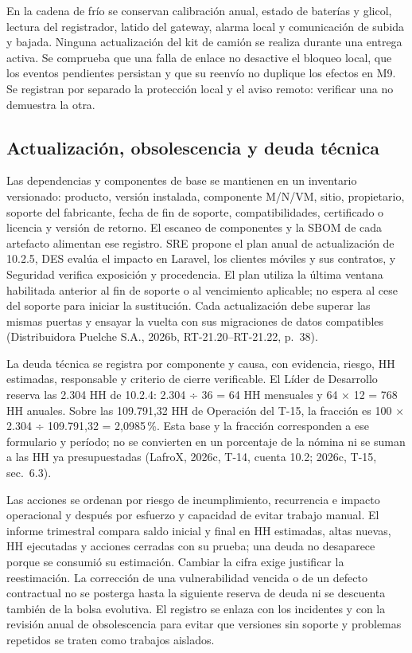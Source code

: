 En la cadena de frío se conservan calibración anual, estado de baterías y glicol, lectura del registrador, latido del gateway, alarma local y comunicación de subida y bajada. Ninguna actualización del kit de camión se realiza durante una entrega activa. Se comprueba que una falla de enlace no desactive el bloqueo local, que los eventos pendientes persistan y que su reenvío no duplique los efectos en M9. Se registran por separado la protección local y el aviso remoto: verificar una no demuestra la otra.

\subsection{Actualización, obsolescencia y deuda técnica}
\label{subsec:sd11-vigencia}

Las dependencias y componentes de base se mantienen en un inventario versionado: producto, versión instalada, componente M/N/VM, sitio, propietario, soporte del fabricante, fecha de fin de soporte, compatibilidades, certificado o licencia y versión de retorno. El escaneo de componentes y la SBOM de cada artefacto alimentan ese registro. SRE propone el plan anual de actualización de 10.2.5, DES evalúa el impacto en Laravel, los clientes móviles y sus contratos, y Seguridad verifica exposición y procedencia. El plan utiliza la última ventana habilitada anterior al fin de soporte o al vencimiento aplicable; no espera al cese del soporte para iniciar la sustitución. Cada actualización debe superar las mismas puertas y ensayar la vuelta con sus migraciones de datos compatibles (Distribuidora Puelche S.A., 2026b, RT-21.20--RT-21.22, p.~38).

La deuda técnica se registra por componente y causa, con evidencia, riesgo, HH estimadas, responsable y criterio de cierre verificable. El Líder de Desarrollo reserva las 2.304 HH de 10.2.4: 2.304 ÷ 36 = 64 HH mensuales y 64 × 12 = 768 HH anuales. Sobre las 109.791,32 HH de Operación del T-15, la fracción es 100 × 2.304 ÷ 109.791,32 = 2,0985\,\%. Esta base y la fracción corresponden a ese formulario y período; no se convierten en un porcentaje de la nómina ni se suman a las HH ya presupuestadas (LafroX, 2026c, T-14, cuenta 10.2; 2026c, T-15, sec.~6.3).

Las acciones se ordenan por riesgo de incumplimiento, recurrencia e impacto operacional y después por esfuerzo y capacidad de evitar trabajo manual. El informe trimestral compara saldo inicial y final en HH estimadas, altas nuevas, HH ejecutadas y acciones cerradas con su prueba; una deuda no desaparece porque se consumió su estimación. Cambiar la cifra exige justificar la reestimación. La corrección de una vulnerabilidad vencida o de un defecto contractual no se posterga hasta la siguiente reserva de deuda ni se descuenta también de la bolsa evolutiva. El registro se enlaza con los incidentes y con la revisión anual de obsolescencia para evitar que versiones sin soporte y problemas repetidos se traten como trabajos aislados.
